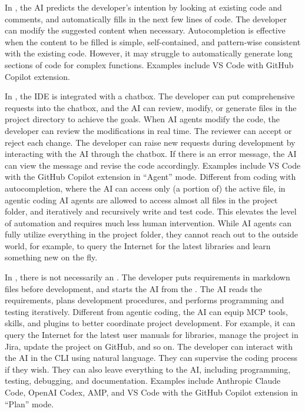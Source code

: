 In , the AI predicts the developer's intention by looking at existing code and comments, and automatically fills in the next few lines of code. The developer can modify the suggested content when necessary. Autocompletion is effective when the content to be filled is simple, self-contained, and pattern-wise consistent with the existing code. However, it may struggle to automatically generate long sections of code for complex functions. Examples include VS Code with GitHub Copilot extension.

In , the IDE is integrated with a chatbox. The developer can put comprehensive requests into the chatbox, and the AI can review, modify, or generate files in the project directory to achieve the goals. When AI agents modify the code, the developer can review the modifications in real time. The reviewer can accept or reject each change. The developer can raise new requests during development by interacting with the AI through the chatbox. If there is an error message, the AI can view the message and revise the code accordingly. Examples include VS Code with the GitHub Copilot extension in ``Agent'' mode. Different from coding with autocompletion, where the AI can access only (a portion of) the active file, in agentic coding AI agents are allowed to access almost all files in the project folder, and iteratively and recursively write and test code. This elevates the level of automation and requires much less human intervention. While AI agents can fully utilize everything in the project folder, they cannot reach out to the outside world, for example, to query the Internet for the latest libraries and learn something new on the fly.

In , there is not necessarily an . The developer puts requirements in markdown files before development, and starts the AI from the . The AI reads the requirements, plans development procedures, and performs programming and testing iteratively. Different from agentic coding, the AI can equip MCP tools, skills, and plugins to better coordinate project development. For example, it can query the Internet for the latest user manuals for libraries, manage the project in Jira, update the project on GitHub, and so on. The developer can interact with the AI in the CLI using natural language. They can supervise the coding process if they wish. They can also leave everything to the AI, including programming, testing, debugging, and documentation. Examples include Anthropic Claude Code, OpenAI Codex, AMP, and VS Code with the GitHub Copilot extension in ``Plan'' mode.

